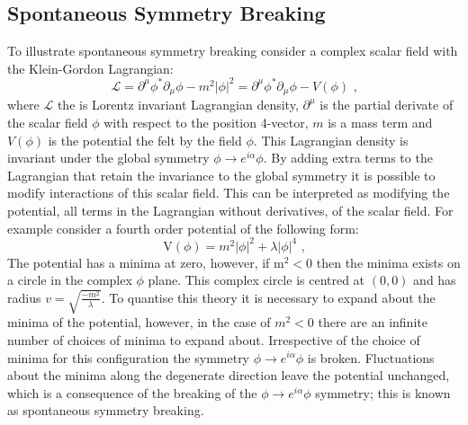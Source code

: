 \subsection{Spontaneous Symmetry Breaking}
\label{sec:ssb}
To illustrate spontaneous symmetry breaking consider a complex scalar field \phi with the Klein-Gordon Lagrangian:
%
\begin{equation}
\mathcal{L} = \partial^{\mu} \phi^{*} \partial_{\mu} \phi -m^{2} |\phi|^{2} = \partial^{\mu} \phi^{*} \partial_{\mu} \phi - V(\phi) \text{ ,}
\end{equation}
%
\noindent where $\mathcal{L}$ the is Lorentz invariant Lagrangian density, $\partial^{\mu}$ is the partial derivate of the scalar field $\phi$ with respect to the position 4-vector, $m$ is a mass term and $V(\phi)$ is the potential the felt by the field $\phi$.  This Lagrangian density is invariant under the global symmetry $\phi \rightarrow e^{i\alpha} \phi$.  By adding extra terms to the Lagrangian that retain the invariance to the global symmetry it is possible to modify interactions of this scalar field.  This can be interpreted as modifying the potential, all terms in the Lagrangian without derivatives, of the scalar field.  For example consider a fourth order potential of the following form:
%
\begin{equation}
\text{V}(\phi) = m^{2}|\phi|^{2} + \lambda |\phi|^{4} \text{ ,}
\end{equation}
%
\noindent The potential has a minima at zero, however, if $\text{m}^{2} < 0$ then the minima exists on a circle in the complex $\phi$ plane.  This complex circle is centred at $(0,0)$ and has radius $v = \sqrt{\frac{-m^{2}}{\lambda}}$.  To quantise this theory it is necessary to expand about the minima of the potential, however, in the case of $m^{2} < 0$ there are an infinite number of choices of minima to expand about.  Irrespective of the choice of minima for this configuration the symmetry $\phi \rightarrow e^{i\alpha} \phi$ is broken.  Fluctuations about the minima along the degenerate direction leave the potential unchanged, which is a consequence of the breaking of the $\phi \rightarrow e^{i\alpha} \phi$ symmetry; this is known as spontaneous symmetry breaking.

